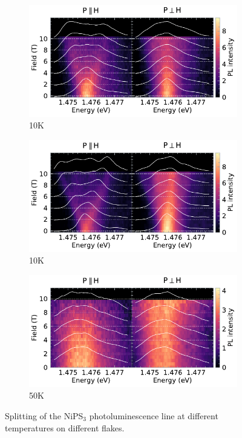 \documentclass[
	twoside,
	parskip=half,
	a4paper,
]{scrbook}
\begin{document}
\begin{figure}
	\centering
	\begin{subfigure}{4in}
		\includegraphics{../figures/2024-04-18 NiPS4 splitting 10K.pdf}
		\caption{10K}
		\label{fig:NiPS3 10K}
	\end{subfigure}
	\begin{subfigure}{4in}
		\includegraphics{../figures/2024-04-18 NiPS4 splitting 10K multiple flakes.pdf}
		\caption{10K}
		\label{fig:NiPS3 10K multiple flakes}
	\end{subfigure}
	\begin{subfigure}{4in}
		\includegraphics{../figures/2024-04-18 NiPS4 splitting 50K.pdf}
		\caption{50K}
		\label{fig:NiPS3 50K}
	\end{subfigure}
	\caption{Splitting of the NiPS$_3$ photoluminescence line at different temperatures on different flakes.}
	\label{fig:NiPS3 multiple temperatures}
\end{figure}
\end{document}
